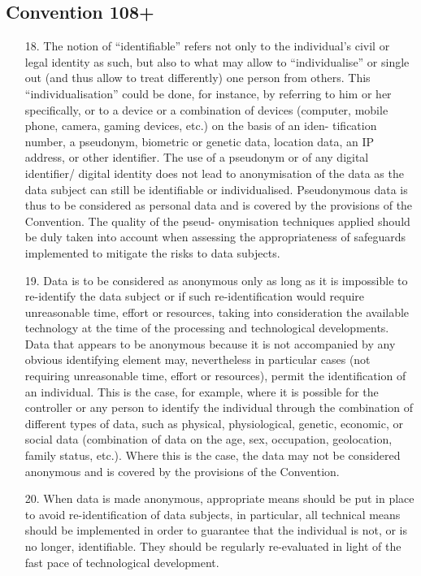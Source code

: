 \documentclass[aps,prb,twocolumn,superscriptaddress,floatfix,longbibliography,nofootinbib]{revtex4-2}
\begin{document}
  \subsection{\label{subsec:Conv108}Convention 108+}
    \begin{enumerate}
      \item[18.] The notion of “identifiable” refers not only to the
    individual’s civil or legal identity as such, but also to
    what may allow to “individualise” or single out (and
    thus allow to treat differently) one person from others.
    This “individualisation” could be done, for instance, by
    referring to him or her specifically, or to a device or
    a combination of devices (computer, mobile phone,
    camera, gaming devices, etc.) on the basis of an iden-
    tification number, a pseudonym, biometric or genetic
    data, location data, an IP address, or other identifier.
    The use of a pseudonym or of any digital identifier/
    digital identity does not lead to anonymisation of 
    the data as the data subject can still be identifiable
    or individualised. Pseudonymous data is thus to be
    considered as personal data and is covered by the
    provisions of the Convention. The quality of the pseud-
    onymisation techniques applied should be duly taken
    into account when assessing the appropriateness of
    safeguards implemented to mitigate the risks to data
    subjects.

    \item[19.] Data is to be considered as anonymous only as
    long as it is impossible to re-identify the data subject
    or if such re-identification would require unreasonable
    time, effort or resources, taking into consideration the
    available technology at the time of the processing
    and technological developments. Data that appears
    to be anonymous because it is not accompanied by
    any obvious identifying element may, nevertheless
    in particular cases (not requiring unreasonable time,
    effort or resources), permit the identification of an
    individual. This is the case, for example, where it is
    possible for the controller or any person to identify
    the individual through the combination of different
    types of data, such as physical, physiological, genetic,
    economic, or social data (combination of data on the
    age, sex, occupation, geolocation, family status, etc.).
    Where this is the case, the data may not be considered
    anonymous and is covered by the provisions of the
    Convention.

    \item[20.] When data is made anonymous, appropriate
    means should be put in place to avoid re-identification
    of data subjects, in particular, all technical means
    should be implemented in order to guarantee that
    the individual is not, or is no longer, identifiable. They
    should be regularly re-evaluated in light of the fast
    pace of technological development.
    \end{enumerate}
    \cite{Conv108+}
\end{document}

